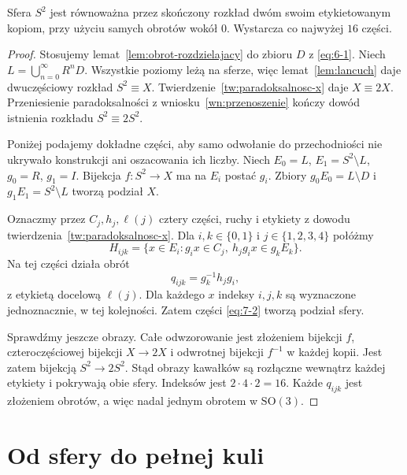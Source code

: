 \begin{twierdzenie}\label{tw:pelna-sfera}
Sfera $S^2$ jest równoważna przez skończony rozkład dwóm swoim etykietowanym kopiom, przy użyciu samych obrotów wokół $0$. Wystarcza co najwyżej $16$ części.
\end{twierdzenie}
\begin{proof}
Stosujemy lemat~\ref{lem:obrot-rozdzielajacy} do zbioru $D$ z \eqref{eq:6-1}. Niech $L=\bigcup_{n=0}^\infty R^nD$. Wszystkie poziomy leżą na sferze, więc lemat~\ref{lem:lancuch} daje dwuczęściowy rozkład $S^2\equiv X$. Twierdzenie~\ref{tw:paradoksalnosc-x} daje $X\equiv2X$. Przeniesienie paradoksalności z wniosku~\ref{wn:przenoszenie} kończy dowód istnienia rozkładu $S^2\equiv2S^2$.

Poniżej podajemy dokładne części, aby samo odwołanie do przechodniości nie ukrywało konstrukcji ani oszacowania ich liczby. Niech $E_0=L$, $E_1=S^2\setminus L$, $g_0=R$, $g_1=I$. Bijekcja $f:S^2\to X$ ma na $E_i$ postać $g_i$. Zbiory $g_0E_0=L\setminus D$ i $g_1E_1=S^2\setminus L$ tworzą podział $X$.

Oznaczmy przez $C_j,h_j,\ell(j)$ cztery części, ruchy i etykiety z dowodu twierdzenia~\ref{tw:paradoksalnosc-x}. Dla $i,k\in\{0,1\}$ i $j\in\{1,2,3,4\}$ połóżmy
\begin{equation}\label{eq:7-2}
 H_{ijk}=\{x\in E_i:g_ix\in C_j,\ h_jg_ix\in g_kE_k\}.
\end{equation}
Na tej części działa obrót
\begin{equation}\label{eq:7-3}
 q_{ijk}=g_k^{-1}h_jg_i,
\end{equation}
z etykietą docelową $\ell(j)$. Dla każdego $x$ indeksy $i,j,k$ są wyznaczone jednoznacznie, w tej kolejności. Zatem części \eqref{eq:7-2} tworzą podział sfery.

Sprawdźmy jeszcze obrazy. Całe odwzorowanie jest złożeniem bijekcji $f$, czteroczęściowej bijekcji $X\to2X$ i odwrotnej bijekcji $f^{-1}$ w każdej kopii. Jest zatem bijekcją $S^2\to2S^2$. Stąd obrazy kawałków są rozłączne wewnątrz każdej etykiety i pokrywają obie sfery. Indeksów jest $2\cdot4\cdot2=16$. Każde $q_{ijk}$ jest złożeniem obrotów, a więc nadal jednym obrotem w $\mathrm{SO}(3)$.
\end{proof}

\section{Od sfery do pełnej kuli}
